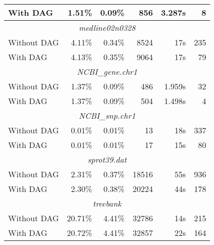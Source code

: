 \documentclass[12pt]{llncs}
\begin{document}
\begin{longtable}{lrrrrr}
			With DAG&1.51\%&0.09\%&856&3.287s&8\\
			\midrule\multicolumn{6}{c}{\emph{medline02n0328}}\\*
			Without DAG&4.11\%&0.34\%&8524&17s&235\\*
			With DAG&4.13\%&0.35\%&9064&17s&79\\
			\midrule\multicolumn{6}{c}{\emph{NCBI\_gene.chr1}}\\*
			Without DAG&1.37\%&0.09\%&486&1.959s&32\\*
			With DAG&1.37\%&0.09\%&504&1.498s&4\\
			\midrule\multicolumn{6}{c}{\emph{NCBI\_snp.chr1}}\\*
			Without DAG&\,0.01\%&\,0.01\%&13&18s&337\\*
			With DAG&\,0.01\%&\,0.01\%&17&15s&80\\
			\midrule\multicolumn{6}{c}{\emph{sprot39.dat}}\\*
			Without DAG&2.31\%&0.37\%&18516&55s&936\\*
			With DAG&2.30\%&0.38\%&20224&44s&178\\
			\midrule\multicolumn{6}{c}{\emph{treebank}}\\*
			Without DAG&20.71\%&4.41\%&32786&14s&215\\*
			With DAG&20.72\%&4.41\%&32857&22s&164\\
			\bottomrule
		\end{longtable}
\end{document}
